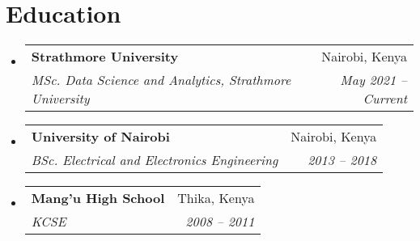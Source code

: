 \documentclass[letterpaper,11pt]{article}
\makeatletter
\newcommand{\resumeSubheading}[4]{
  \vspace{-2pt}\item
  \begin{tabular*}{0.97\textwidth}[t]{l@{\extracolsep{\fill}}r}
    \textbf{#1} & #2 \\
    \textit{\small#3} & \textit{\small #4} \\
  \end{tabular*}\vspace{-7pt}
}
\newcommand{\resumeSubHeadingListStart}{\begin{itemize}[leftmargin=0.15in, label={}]}
\newcommand{\resumeSubHeadingListEnd}{\end{itemize}}
\makeatother
\begin{document}
\section{Education}
\resumeSubHeadingListStart
\resumeSubheading
    {Strathmore University}{Nairobi, Kenya}
    {MSc. Data Science and Analytics, Strathmore University}{May 2021 -- Current}
\resumeSubheading
    {University of Nairobi}{Nairobi, Kenya}
    {BSc. Electrical and Electronics Engineering}{2013 -- 2018}
\resumeSubheading
    {Mang'u High School}{Thika, Kenya}
    {KCSE}{2008 -- 2011}
\resumeSubHeadingListEnd    
\end{document}
